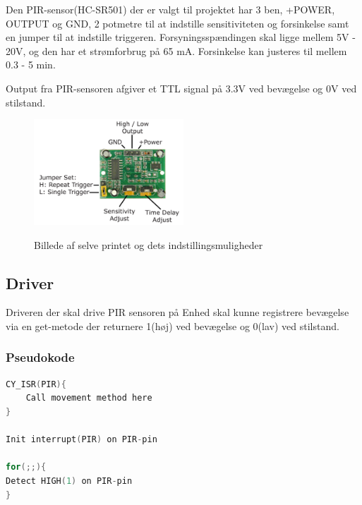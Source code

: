 Den PIR-sensor(HC-SR501) der er valgt til projektet har 3 ben, +POWER, OUTPUT og GND, 2 potmetre til at indstille sensitiviteten og forsinkelse samt en jumper til at indstille triggeren. Forsyningsspændingen skal ligge mellem 5V - 20V, og den har et strømforbrug på 65 mA. Forsinkelse kan justeres til mellem 0.3 - 5 min.

Output fra PIR-sensoren afgiver et TTL signal på 3.3V ved bevægelse og 0V ved stilstand.

\begin{figure}[H] \centering
{\includegraphics[width=0.5\textwidth]{filer/design/Billeder/pir_overview}}
\caption{Billede af selve printet og dets indstillingsmuligheder}
\label{lab:pir_overview}
\raggedright
\end{figure}

\subsection*{Driver}

Driveren der skal drive PIR sensoren på Enhed skal kunne registrere bevægelse via en get-metode der returnere 1(høj) ved bevægelse og 0(lav) ved stilstand.

\subsubsection*{Pseudokode}

\begin{lstlisting}[language=C]
CY_ISR(PIR){
    Call movement method here
} 

Init interrupt(PIR) on PIR-pin

for(;;){
Detect HIGH(1) on PIR-pin
}
\end{lstlisting}